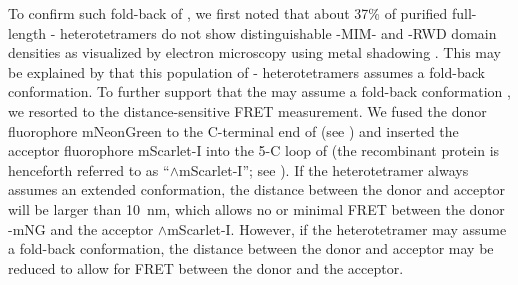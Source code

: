 To confirm such fold-back of , we first noted that about 37\% of purified full-length - heterotetramers do not show distinguishable -MIM- and -RWD domain densities as visualized by electron microscopy using metal shadowing \cite{BUB1-CDC20-MAD1}. This may be explained by that this population of - heterotetramers assumes a fold-back conformation. To further support that the  may assume a fold-back conformation , we resorted to the distance-sensitive FRET measurement. We fused the donor fluorophore mNeonGreen to the C-terminal end of  (see ) and inserted the acceptor fluorophore mScarlet-I into the \textbeta{}5-\textalpha{}C loop of  \cite{mSI, beta5-alphaCLoop} (the recombinant protein is henceforth referred to as ``$\wedge$mScarlet-I''; see ). If the heterotetramer always assumes an extended conformation, the distance between the donor and acceptor will be larger than \SI{10}{nm}, which allows no or minimal FRET between the donor -mNG and the acceptor $\wedge$mScarlet-I. However, if the heterotetramer may assume a fold-back conformation, the distance between the donor and acceptor may be reduced to allow for FRET between the donor and the acceptor.

